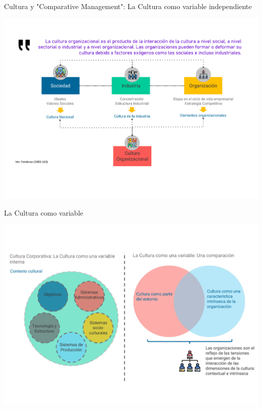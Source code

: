 \documentclass[aspectratio=169]{beamer}
\begin{document}
	\begin{frame}{Cultura y "Comparative Management": La Cultura como variable independiente}
		\begin{center}
			\includegraphics[height=\textheight]{./figures/L6.pdf}
		\end{center}
	\end{frame}

	\begin{frame}{La Cultura como variable}
		\begin{center}
			\includegraphics[height=\textheight]{./figures/L7.pdf}
		\end{center}
	\end{frame}
\end{document}
